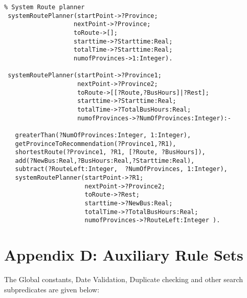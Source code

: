 \begin{verbatim}
% System Route planner
 systemRoutePlanner(startPoint->?Province;  
                   nextPoint->?Province;  
                   toRoute->[]; 
                   starttime->?Starttime:Real; 
                   totalTime->?Starttime:Real; 
                   numofProvinces->1:Integer).
      
 systemRoutePlanner(startPoint->?Province1;  
                    nextPoint->?Province2;  
                    toRoute->[[?Route,?BusHours]|?Rest]; 
                    starttime->?Starttime:Real;
                    totalTime->?TotalBusHours:Real; 
                    numofProvinces->?NumOfProvinces:Integer):-
  
   greaterThan(?NumOfProvinces:Integer, 1:Integer),
   getProvinceToRecommendation(?Province1,?R1),
   shortestRoute(?Province1, ?R1, [?Route, ?BusHours]),
   add(?NewBus:Real,?BusHours:Real,?Starttime:Real),
   subtract(?RouteLeft:Integer,  ?NumOfProvinces, 1:Integer),
   systemRoutePlanner(startPoint->?R1; 
                      nextPoint->?Province2;   
                      toRoute->?Rest; 
                      starttime->?NewBus:Real; 
                      totalTime->?TotalBusHours:Real; 
                      numofProvinces->?RouteLeft:Integer ).                                                   
\end{verbatim}

\chapter*{Appendix D: Auxiliary Rule Sets}
 The
Global constants, Date Validation, Duplicate checking and other search 
subpredicates are given below:

